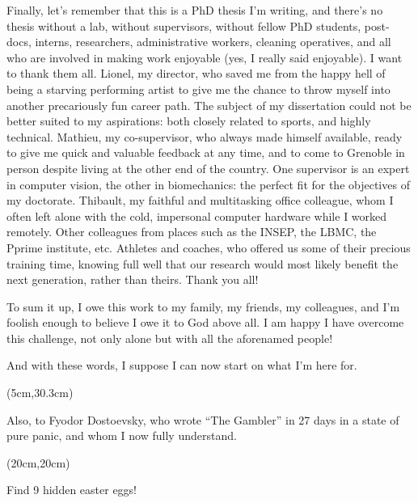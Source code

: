 Finally, let’s remember that this is a PhD thesis I’m writing, and there’s no thesis without a lab, without supervisors, without fellow PhD students, post-docs, interns, researchers, administrative workers, cleaning operatives, and all who are involved in making work enjoyable (yes, I really said enjoyable). I want to thank them all. Lionel, my director, who saved me from the happy hell of being a starving performing artist to give me the chance to throw myself into another precariously fun career path. The subject of my dissertation could not be better suited to my aspirations: both closely related to sports, and highly technical. Mathieu, my co-supervisor, who always made himself available, ready to give me quick and valuable feedback at any time, and to come to Grenoble in person despite living at the other end of the country. One supervisor is an expert in computer vision, the other in biomechanics: the perfect fit for the objectives of my doctorate. Thibault, my faithful and multitasking office colleague, whom I often left alone with the cold, impersonal computer hardware while I worked remotely. Other colleagues from places such as the INSEP, the LBMC, the Pprime institute, etc. Athletes and coaches, who offered us some of their precious training time, knowing full well that our research would most likely benefit the next generation, rather than theirs. Thank you all!

To sum it up, I owe this work to my family, my friends, my colleagues, and I’m foolish enough to believe I owe it to God above all. I am happy I have overcome this challenge, not only alone but with all the aforenamed people!

And with these words, I suppose I can now start on what I’m here for.

\begin{textblock*}{10cm}(5cm,30.3cm) %
      \begin{turn}{0} 
      \scriptsize Also, to Fyodor Dostoevsky, who wrote “The Gambler” in 27 days in a state of pure panic, and whom I now fully understand. \newline
      \end{turn}
\end{textblock*}

\begin{textblock*}{10cm}(20cm,20cm) %
      \begin{turn}{90} 
            \normalsize \emojiegg
            \scriptsize Find 9 hidden easter eggs! 
      \end{turn}
\end{textblock*}